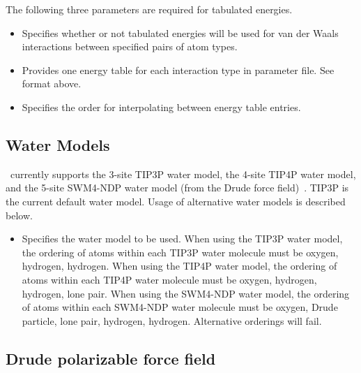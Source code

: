 The following three parameters are required for tabulated energies.

\begin{itemize}

\item
{}
{Specifies whether or not tabulated energies will be used for
van der Waals interactions between specified pairs of atom types.}

\item
{}
{Provides one energy table for each interaction type in parameter file.
See format above.}

\item
{}
{Specifies the order for interpolating between energy table entries.}

\end{itemize}


\subsection{Water Models}
\label{section:water_models}

\NAMD~currently supports the 3-site TIP3P water model, 
the 4-site TIP4P water model,
and the 5-site SWM4-NDP water model 
(from the Drude force field)~\cite{Lamoureux-2006a}.  
TIP3P is the current default water model.  
Usage of alternative water models is described below. 

\begin{itemize}

  \item
    {Specifies the water model to be used.
When using the TIP3P water model, the ordering of atoms within each
TIP3P water molecule must be oxygen, hydrogen, hydrogen.  
When using the TIP4P water model, the ordering of atoms within each
TIP4P water molecule must be oxygen, hydrogen, hydrogen, lone pair.
When using the SWM4-NDP water model, 
the ordering of atoms within each SWM4-NDP water molecule
must be oxygen, Drude particle, lone pair, hydrogen, hydrogen.  
Alternative orderings will fail. } 

\end{itemize}


\subsection{Drude polarizable force field}
\label{section:drude_forcefield}

